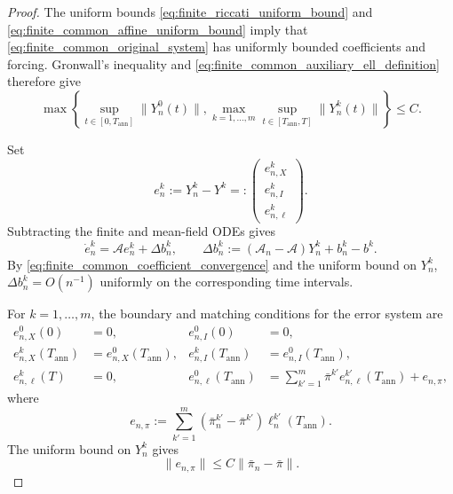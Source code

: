 \documentclass[12pt]{article}
\numberwithin{equation}{section}
\theoremstyle{definition}
\begin{document}
\begin{proof}
The uniform bounds \eqref{eq:finite_riccati_uniform_bound} and
\eqref{eq:finite_common_affine_uniform_bound} imply that
\eqref{eq:finite_common_original_system} has uniformly bounded coefficients
and forcing. Gronwall's inequality and
\eqref{eq:finite_common_auxiliary_ell_definition} therefore give
\[
\max\left\{
\sup_{t\in[0,T_{\mathrm{ann}}]}\|Y_n^0(t)\|,
\max_{k=1,\ldots,m}\sup_{t\in[T_{\mathrm{ann}},T]}\|Y_n^k(t)\|
\right\}
\leq
C.
\]

Set
\[
e_n^k
:=
Y_n^k-Y^k
=:
\begin{pmatrix}
e_{n,X}^k\\
e_{n,I}^k\\
e_{n,\ell}^k
\end{pmatrix}.
\]
Subtracting the finite and mean-field ODEs gives
\[
\dot e_n^k
=
\mathcal Ae_n^k+\Delta b_n^k,
\qquad
\Delta b_n^k
:=
\left(
\mathcal A_n-\mathcal A
\right)Y_n^k
+
b_n^k-b^k.
\]
By \eqref{eq:finite_common_coefficient_convergence} and the uniform bound on
\(Y_n^k\), \(\Delta b_n^k=O(n^{-1})\) uniformly on the corresponding time
intervals.

For \(k=1,\ldots,m\), the boundary and matching conditions for the error
system are
\[
\begin{aligned}
e_{n,X}^0(0)&=0,
&
e_{n,I}^0(0)&=0,
\\
e_{n,X}^k(T_{\mathrm{ann}})
&=e_{n,X}^0(T_{\mathrm{ann}}),
&
e_{n,I}^k(T_{\mathrm{ann}})
&=e_{n,I}^0(T_{\mathrm{ann}}),
\\
e_{n,\ell}^k(T)&=0,
&
e_{n,\ell}^0(T_{\mathrm{ann}})
&=
\sum_{k'=1}^m
\bar\pi^{k'} e_{n,\ell}^{k'}(T_{\mathrm{ann}})
+
e_{n,\pi},
\end{aligned}
\]
where
\[
e_{n,\pi}
:=
\sum_{k'=1}^m
\left(
\bar\pi_n^{k'}-\bar\pi^{k'}
\right)
\ell_n^{k'}(T_{\mathrm{ann}}).
\]
The uniform bound on \(Y_n^k\) gives
\[
\|e_{n,\pi}\|
\leq
C\|\bar\pi_n-\bar\pi\|.
\]


\end{proof}
\end{document}

